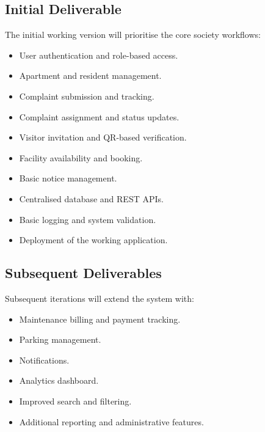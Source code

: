 \documentclass[11pt,a4paper]{article}
\begin{document}
\subsection{Initial Deliverable}

The initial working version will prioritise the core society workflows:

\begin{itemize}

    \item User authentication and role-based access.

    \item Apartment and resident management.

    \item Complaint submission and tracking.

    \item Complaint assignment and status updates.

    \item Visitor invitation and QR-based verification.

    \item Facility availability and booking.

    \item Basic notice management.

    \item Centralised database and REST APIs.

    \item Basic logging and system validation.

    \item Deployment of the working application.

\end{itemize}

\subsection{Subsequent Deliverables}

Subsequent iterations will extend the system with:

\begin{itemize}

    \item Maintenance billing and payment tracking.

    \item Parking management.

    \item Notifications.

    \item Analytics dashboard.

    \item Improved search and filtering.

    \item Additional reporting and administrative features.

\end{itemize}
\end{document}
